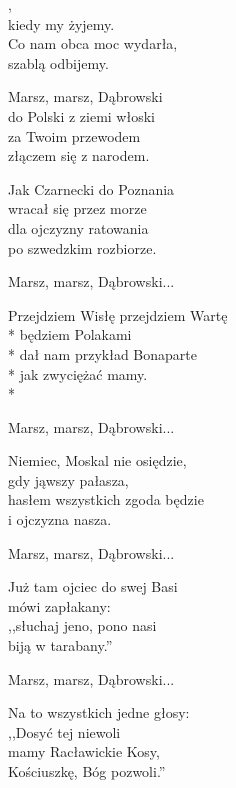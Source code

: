 \documentclass[12pt,a4paper,twoside]{songbook}
\begin{document}
  \begin{info}
    \lipsum
  \end{info}

  
  \begin{lyrics}[multicol=true, longestline=Przejdziem Wisłę przejdziem Wartę]
    ,\\
    kiedy my żyjemy.\\
    Co nam obca moc wydarła,\\
    szablą odbijemy.
    
    Marsz, marsz, Dąbrowski\\
    do Polski z ziemi włoski\\
    za Twoim przewodem\\
    złączem się z narodem.
    
    Jak Czarnecki do Poznania\\
    wracał się przez morze\\
    dla ojczyzny ratowania\\
    po szwedzkim rozbiorze.
    
    Marsz, marsz, Dąbrowski...
    
    
    Przejdziem Wisłę przejdziem Wartę\\*
    będziem Polakami\\*
    dał nam przykład Bonaparte\\*
    jak zwyciężać mamy.\\*
    
    Marsz, marsz, Dąbrowski...
    
    Niemiec, Moskal nie osiędzie,\\
    gdy jąwszy pałasza,\\
    hasłem wszystkich zgoda będzie\\
    i ojczyzna nasza.

    Marsz, marsz, Dąbrowski...

    Już tam ojciec do swej Basi\\
    mówi zapłakany:\\
    ,,słuchaj jeno, pono nasi\\
    biją w tarabany.''

    Marsz, marsz, Dąbrowski...

    Na to wszystkich jedne głosy:\\
    ,,Dosyć tej niewoli\\
    mamy Racławickie Kosy,\\
    Kościuszkę, Bóg pozwoli.''
  \end{lyrics}
\end{document}
